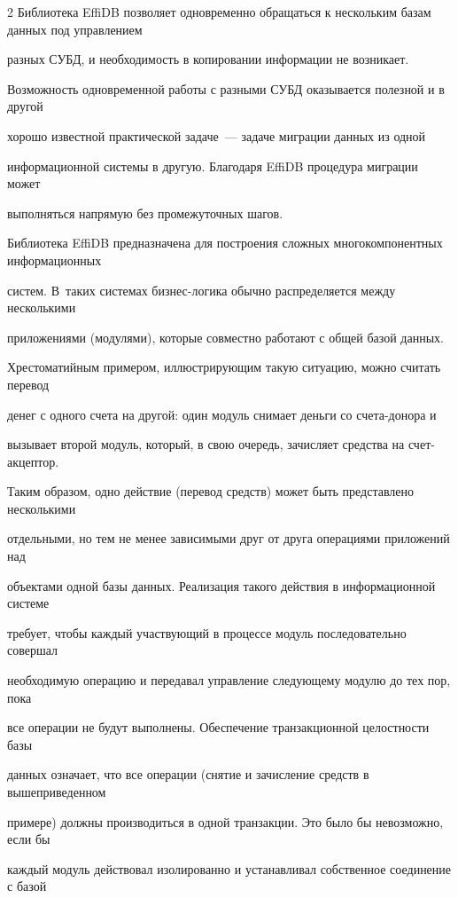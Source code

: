 \begin{multicols}{2}
Библиотека EffiDB позволяет одновременно обращаться к нескольким базам данных под управ\-ле\-ни\-ем 

разных СУБД, и необходимость в копировании информации не возникает. 



Возможность одновременной работы с разными СУБД оказывается полезной и в другой 

хорошо известной практической задаче~--- задаче миграции данных из одной 

информационной системы в другую. Благодаря EffiDB процедура миграции может 

выполняться напрямую без промежуточных шагов.



Библиотека EffiDB предназначена для по\-стро\-ения сложных многокомпонентных информа\-ци\-онных 

сис\-тем. В~таких сис\-те\-мах биз\-нес-ло\-ги\-ка \mbox{обычно} распределяется между несколькими 

приложениями (модулями), которые совместно работают с общей базой данных. 

Хрестоматийным примером, иллюстрирующим такую ситуацию, можно считать перевод 

денег с одного счета на другой: один модуль снимает деньги со сче\-та-до\-но\-ра и 

вызывает второй модуль, который, в свою очередь, зачисляет средства на счет-ак\-цеп\-тор.



Таким образом, одно действие (перевод средств) может быть представлено несколькими 

отдельными, но тем не менее зависимыми друг от друга операциями приложений над 

объектами одной базы данных. Реализация такого действия в информационной системе 

требует, чтобы каждый участвующий в процессе модуль последовательно совершал 

необходимую операцию и передавал управление следующему модулю до тех пор, пока 

все операции не будут выполнены. Обеспечение транзакционной целостности базы 

данных означает, что все операции (снятие и зачисление средств в вышеприведенном 

примере) должны производиться в одной транзакции. Это было бы невозможно, если бы

каждый модуль действовал изолированно и уста\-нав\-ли\-вал собственное соединение с базой 


\end{multicols}
